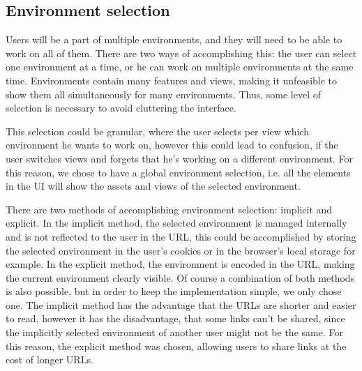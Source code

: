 \begin{itemize}




\subsection{Environment selection}

Users will be a part of multiple environments, and they will need to be able to work on
all of them.
There are two ways of accomplishing this: the user can select one environment at a time,
or he can work on multiple environments at the same time.
%
%
Environments contain many features and views, making it unfeasible to show them all
simultaneously for many environments.
Thus, some level of selection is necessary to avoid cluttering the interface.

%
This selection could be granular, where the user selects per view which environment he
wants to work on, however this could lead to confusion, if the user switches views and
forgets that he's working on a different environment.
For this reason, we chose to have a global environment selection, i.e. all the elements in
the UI will show the assets and views of the selected environment.

There are two methods of accomplishing environment selection: implicit and explicit.
In the implicit method, the selected environment is managed internally and is not
reflected to the user in the URL, this could be accomplished by storing the selected
environment in the user's cookies or in the browser's local storage for example.
In the explicit method, the environment is encoded in the URL,
making the current environment clearly visible.
Of course a combination of both methods is also possible, but in order to keep the
implementation simple, we only chose one.
The implicit method has the advantage that the URLs are shorter and easier to read,
however it has the disadvantage, that some links can't be shared, since the implicitly
selected environment of another user might not be the same. 
For this reason, the explicit method was chosen, allowing users to share links at the
cost of longer URLs.


\end{itemize}
